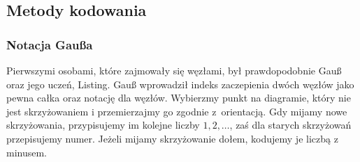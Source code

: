 
\subsection{Metody kodowania}
\subsubsection{Notacja Gaußa}
%
Pierwszymi osobami, które zajmowały się węzłami, był prawdopodobnie Gauß oraz jego uczeń, Listing.
%
%
Gauß wprowadził indeks zaczepienia dwóch węzłów jako pewna całka oraz notację dla węzłów.
Wybierzmy punkt na diagramie, który nie jest skrzyżowaniem i przemierzajmy go zgodnie z~orientacją.
Gdy mijamy nowe skrzyżowania, przypisujemy im kolejne liczby $1, 2, \ldots$, zaś dla starych skrzyżowań przepisujemy numer.
Jeżeli mijamy skrzyżowanie dołem, kodujemy je liczbą z minusem.

